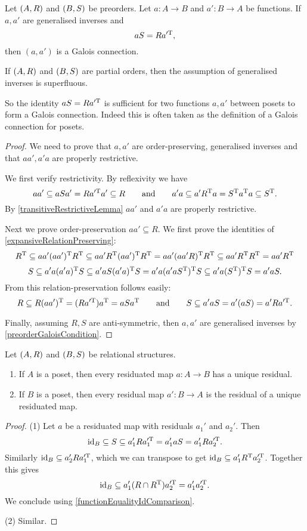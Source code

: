\begin{proposition} \label{preorderGaloisIdentity}
Let $\left( A,R \right)$ and $\left( B,S \right)$ be preorders. Let $a: A\to B$ and $a': B\to A$ be functions. If $a,a'$ are generalised inverses and
\[ aS = Ra^{\prime \mathrm{T}}, \]
then $(a, a')$ is a Galois connection.

If $\left( A,R \right)$ and $\left( B,S \right)$ are partial orders, then the assumption of generalised inverses is superfluous. 
\end{proposition}
So the identity $aS = Ra^{\prime \mathrm{T}}$ is sufficient for two functions $a,a'$ between posets to form a Galois connection. Indeed this is often taken as the definition of a Galois connection for posets.
\begin{proof}
We need to prove that $a,a'$ are order-preserving, generalised inverses and that $aa', a'a$ are properly restrictive.

We first verify restrictivity. By reflexivity we have
\[ aa' \subseteq aSa' = Ra^{\prime \mathrm{T}}a' \subseteq R \qquad\text{and}\qquad a'a \subseteq a'R^{\mathrm{T}} a = S^{\mathrm{T}} a^{\mathrm{T}} a \subseteq S^{\mathrm{T}}. \]
By \ref{transitiveRestrictiveLemma} $aa'$ and $a'a$ are properly restrictive.

Next we prove order-preservation $aa'\subseteq R$. We first prove the identities of \ref{expansiveRelationPreserving}:
\[ R^{\mathrm{T}} \subseteq aa'(aa')^{\mathrm{T}} R^{\mathrm{T}} \subseteq aa'R^{\mathrm{T}} (aa')^{\mathrm{T}} R^{\mathrm{T}} = aa' (aa'R)^{\mathrm{T}} R^{\mathrm{T}} \subseteq aa'R^{\mathrm{T}} R^{\mathrm{T}} = aa'R^{\mathrm{T}} \]
\[ S \subseteq a'a(a'a)^{\mathrm{T}} S \subseteq a'a S (a'a)^{\mathrm{T}} S = a'a(a'aS^{\mathrm{T}})^{\mathrm{T}} S \subseteq a'a(S^{\mathrm{T}})^{\mathrm{T}} S = a'aS. \]
From this relation-preservation follows easily:
\[ R \subseteq R(aa')^{\mathrm{T}} = (Ra^{\prime \mathrm{T}})a^{\mathrm{T}} = aSa^{\mathrm{T}} \qquad\text{and}\qquad S \subseteq a'aS = a'(aS) = a'Ra^{\prime \mathrm{T}}. \]

Finally, assuming $R,S$ are anti-symmetric, then $a, a'$ are generalised inverses by \ref{preorderGaloisCondition}.
\end{proof}

\begin{proposition}
Let $\left( A,R \right)$ and $\left( B,S \right)$ be relational structures.
\begin{enumerate}
\item If $A$ is a poset, then every residuated map $a: A \to B$ has a unique residual.
\item If $B$ is a poset, then every residual map $a': B \to A$ is the residual of a unique residuated map.
\end{enumerate}
\end{proposition}
\begin{proof}
(1) Let $a$ be a residuated map with residuals $a_1'$ and $a_2'$. Then
\[ \operatorname{id}_B \subseteq S \subseteq a_1'Ra_1^{\prime \mathrm{T}} = a_1'aS = a_1'Ra_2^{\prime \mathrm{T}}. \]
Similarly $\operatorname{id}_B \subseteq a_2'Ra_1^{\prime \mathrm{T}}$, which we can transpose to get $\operatorname{id}_B \subseteq a_1'R^{\mathrm{T}} a_2^{\prime \mathrm{T}}$. Together this gives
\[ \operatorname{id}_B \subseteq a_1'(R\cap R^{\mathrm{T}})a_2^{\prime \mathrm{T}} = a_1'a_2^{\prime \mathrm{T}}. \]
We conclude using \ref{functionEqualityIdComparison}.

(2) Similar.
\end{proof}



